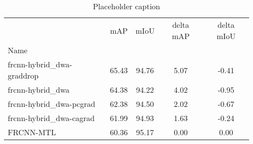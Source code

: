 \begin{table}[htbp]
\centering
\caption{Placeholder caption}
\label{tab:dwa-grad}
\begin{tabular}{lcccc}
\toprule
 & mAP & mIoU & delta mAP & delta mIoU \\
Name &  &  &  &  \\
\midrule
frcnn-hybrid_dwa-graddrop & 65.43 & 94.76 & 5.07 & -0.41 \\
frcnn-hybrid_dwa & 64.38 & 94.22 & 4.02 & -0.95 \\
frcnn-hybrid_dwa-pcgrad & 62.38 & 94.50 & 2.02 & -0.67 \\
frcnn-hybrid_dwa-cagrad & 61.99 & 94.93 & 1.63 & -0.24 \\
FRCNN-MTL & 60.36 & 95.17 & 0.00 & 0.00 \\
\bottomrule
\end{tabular}
\end{table}
